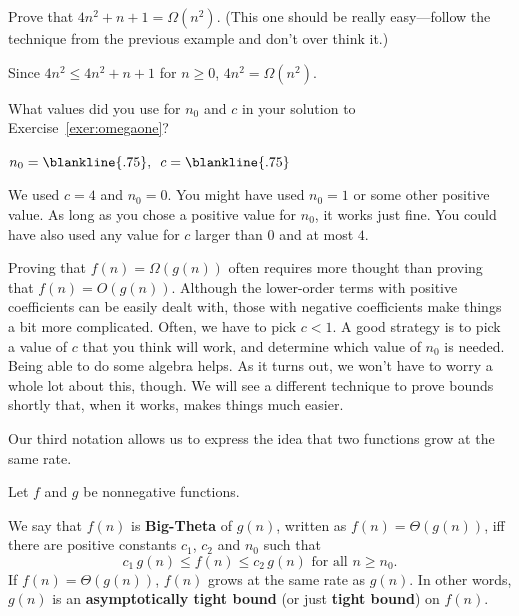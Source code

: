 \begin{exer}\label{exer:omegaone}
Prove that $4n^2+n+1=\Omega(n^2)$. 
(This one should be really easy---follow the technique from the previous example and
don't over think it.)

\vspace*{1.3in}
\begin{answer}
Since $4n^2\leq 4n^2+n+1$ for $n\geq 0$, $4n^2=\Omega(n^2)$.
\end{answer}
\end{exer}

\begin{ques}
What values did you use for $n_0$ and $c$ in your solution to 
Exercise~\ref{exer:omegaone}?

\noindent
$n_0=\blankline{.75},\, \, \,  c=\blankline{.75}$
\begin{answer}
We used $c=4$ and $n_0=0$.  You might have used $n_0=1$ or some other positive value.
As long as you chose a positive value for $n_0$, it works just fine.  You could have also 
used any value for $c$ larger than $0$ and at most $4$.
\end{answer}
\end{ques}

Proving that $f(n)=\Omega(g(n))$ often requires more thought than proving that $f(n)=O(g(n))$.
Although the lower-order terms with positive coefficients can be easily dealt with,
those with negative coefficients make things a bit more complicated.
Often, we have to pick $c<1$.  
A good strategy is to pick a value of $c$ that you think will
work, and determine which value of $n_0$ is needed.
Being able to do some algebra helps.
As it turns out, we won't have to worry a whole lot about this, though.  We will
see a different technique to prove bounds shortly that, when it works, 
makes things much easier.

Our third notation allows us to express the idea that two functions grow at the 
same rate.

\begin{df}
Let $f$ and $g$ be nonnegative functions.

\medskip
\noindent
\begin{minipage}{.45\textwidth}
We say that $f(n)$ is {\bf Big-Theta} of $g(n)$, written as 
$f(n) = \Theta(g(n))$,
iff there are positive constants $c_1$, $c_2$ and $n_{0}$ such that
$$c_1\,g(n)\leq f(n)\leq c_2\,g(n)\mbox{ for all }n \ge n_{0}.$$
If $f(n)=\Theta(g(n))$,
 $f(n)$ grows at the same rate as $g(n)$. In other words,
$g(n)$ is an {\bf asymptotically tight bound} (or just {\bf tight bound}) on $f(n)$.
\end{minipage}
\hfill
\begin{minipage}{.5\textwidth}
\end{minipage}
\end{df}

